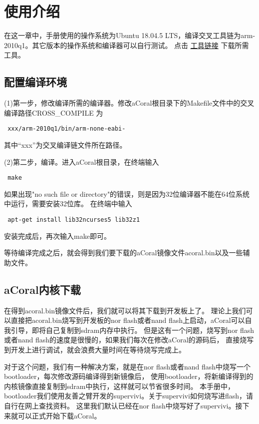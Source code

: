 \chapter{使用介绍}

在这一章中，手册使用的操作系统为Ubuntu 18.04.5 LTS，编译交叉工具链为arm-2010q1。其它版本的操作系统和编译器可以自行测试。
点击 \href{https://github.com/spg-one/aCoral1-Tools}{\underline{工具链接}} 下载所需工具。

\section{配置编译环境}

(1)第一步，修改编译所需的编译器。修改aCoral根目录下的Makefile文件中的交叉编译路径CROSS\_COMPILE 为
\begin{lstlisting}
 xxx/arm-2010q1/bin/arm-none-eabi-
\end{lstlisting}

其中“xxx”为交叉编译链文件所在路径。

(2)第二步，编译。进入aCoral根目录，在终端输入
\begin{lstlisting}
 make
\end{lstlisting}

如果出现"no such file or directory"的错误，则是因为32位编译器不能在64位系统中运行，需要安装32位库。
在终端中输入
\begin{lstlisting}
 apt-get install lib32ncurses5 lib32z1
\end{lstlisting}

安装完成后，再次输入make即可。

等待编译完成之后，就会得到我们要下载的aCoral镜像文件acoral.bin以及一些辅助文件。




\section{aCoral内核下载}

在得到acoral.bin镜像文件后，我们就可以将其下载到开发板上了。
理论上我们可以直接把acoral.bin烧写到开发板的nor flash或者nand flash上启动，aCoral可以自我引导，即将自己复制到sdram内存中执行。
但是这有一个问题，烧写到nor flash或者nand flash的速度是很慢的，如果我们每次在修改aCoral的源码后，
直接烧写到开发上进行调试，就会浪费大量时间在等待烧写完成上。

对于这个问题，我们有一种解决方案，就是在nor flash或者nand flash中烧写一个bootloader，每次修改源码编译得到新镜像后，
使用bootloader，将新编译得到的内核镜像直接复制到sdram中执行，这样就可以节省很多时间。
本手册中，bootloader我们使用友善之臂开发的supervivi。关于supervivi如何烧写进flash，请自行在网上查找资料。
这里我们默认已经在nor flash中烧写好了supervivi。接下来就可以正式开始下载aCoral。

